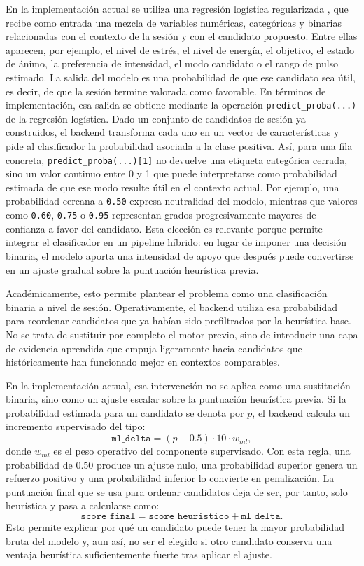 En la implementación actual se utiliza una regresión logística regularizada
\cite{sklearn_logistic_regression}, que recibe como entrada una mezcla de
variables numéricas, categóricas y binarias
relacionadas con el contexto de la sesión y con el candidato propuesto. Entre
ellas aparecen, por ejemplo, el nivel de estrés, el nivel de energía, el
objetivo, el estado de ánimo, la preferencia de intensidad, el modo candidato o
el rango de pulso estimado. La salida del modelo es una probabilidad de que ese
candidato sea útil, es decir, de que la sesión termine valorada como favorable.
En términos de implementación, esa salida se obtiene mediante la operación
\texttt{predict\_proba(...)} de la regresión logística. Dado un conjunto de
candidatos de sesión ya construidos, el backend transforma cada uno en un
vector de características y pide al clasificador la probabilidad asociada a la
clase positiva. Así, para una fila concreta, \texttt{predict\_proba(...)[1]}
no devuelve una etiqueta categórica cerrada, sino un valor continuo entre 0 y
1 que puede interpretarse como probabilidad estimada de que ese modo resulte
útil en el contexto actual. Por ejemplo, una probabilidad cercana a
\texttt{0.50} expresa neutralidad del modelo, mientras que valores como
\texttt{0.60}, \texttt{0.75} o \texttt{0.95} representan grados
progresivamente mayores de confianza a favor del candidato. Esta elección es
relevante porque permite integrar el clasificador en un pipeline híbrido: en
lugar de imponer una decisión binaria, el modelo aporta una intensidad de apoyo
que después puede convertirse en un ajuste gradual sobre la puntuación
heurística previa.

Académicamente, esto permite plantear el problema como una clasificación
binaria a nivel de sesión. Operativamente, el backend utiliza esa probabilidad
para reordenar candidatos que ya habían sido prefiltrados por la heurística
base. No se trata de sustituir por completo el motor previo, sino de introducir
una capa de evidencia aprendida que empuja ligeramente hacia candidatos que
históricamente han funcionado mejor en contextos comparables.

En la implementación actual, esa intervención no se aplica como una sustitución
binaria, sino como un ajuste escalar sobre la puntuación heurística previa. Si
la probabilidad estimada para un candidato se denota por \(p\), el backend
calcula un incremento supervisado del tipo:
\[
\texttt{ml\_delta} = (p - 0.5) \cdot 10 \cdot w_{ml},
\]
donde \(w_{ml}\) es el peso operativo del componente supervisado. Con esta
regla, una probabilidad de \(0.50\) produce un ajuste nulo, una probabilidad
superior genera un refuerzo positivo y una probabilidad inferior lo convierte
en penalización. La puntuación final que se usa para ordenar candidatos deja de
ser, por tanto, solo heurística y pasa a calcularse como:
\[
\texttt{score\_final} = \texttt{score\_heuristico} + \texttt{ml\_delta}.
\]
Esto permite explicar por qué un candidato puede tener la mayor probabilidad
bruta del modelo y, aun así, no ser el elegido si otro candidato conserva una
ventaja heurística suficientemente fuerte tras aplicar el ajuste.

